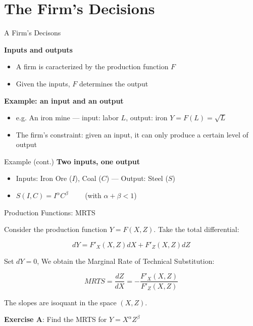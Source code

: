 \documentclass[handout]{beamer}
\newenvironment{iPar}[1]{\textbf{#1} \begin{itemize}}{\end{itemize}}
\newcommand{\mdp}{\medskip \pause}
\begin{document}
\section{The Firm's Decisions}

\begin{frame}{A Firm's Decisons}

\begin{iPar}{Inputs and outputs} \item A firm is caracterized by the production function $F$ \item Given the inputs, $F$ determines the output
\end{iPar}\mdp \begin{iPar}{Example: an input and an output} \item  e.g.
An iron mine ---  input: labor $L$, output: iron $Y = F(L) = \sqrt{L}$ \item The firm's constraint: given an input, it can only produce a certain level of output \end{iPar}

\end{frame}


\begin{frame}{Example (cont.)} \begin{iPar}{Two inputs, one output}
\item Inputs: Iron Ore ($I$), Coal ($C$) --- Output: Steel ($S$) \medskip \item $S(I,C)  = I^{\alpha}C^{\beta}\quad \quad$ (with $\alpha + \beta <1$) 
\end{iPar}
\end{frame}

\begin{frame}{Production Functions: MRTS} 

Consider the production function $Y = F(X,Z)$. Take the total differential: 

$$ dY = F'_X(X,Z)dX + F'_Z(X,Z)dZ $$

Set $dY = 0$, We obtain the Marginal Rate of Technical Substitution: 

$$ MRTS = \frac{dZ}{dX} = -\frac{F'_X(X,Z)}{F'_Z(X,Z)} $$

The slopes are isoquant in the space $(X,Z)$. 

\textbf{Exercise A}: Find the MRTS for  $Y=X^{\alpha} Z^{\beta}$
\end{frame}
\end{document}
